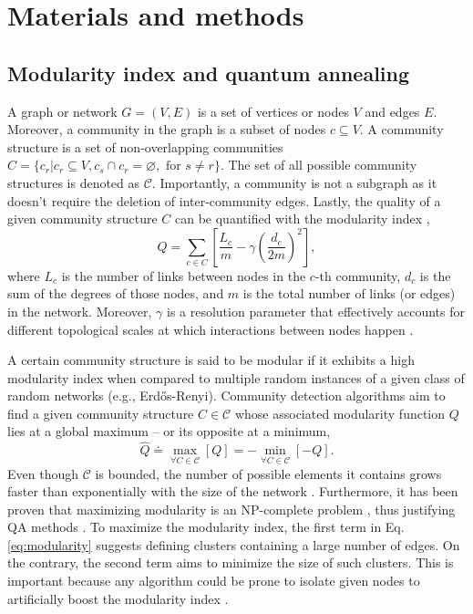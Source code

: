 \documentclass[pdflatex,sn-mathphys-num]{sn-jnl}%
\begin{document}
\section*{Materials and methods} \label{sec:methods}
\subsection*{Modularity index and quantum annealing}
A graph or network $G=(V,E)$ is a set of vertices or nodes $V$ and edges $E$. Moreover, a community in the graph is a subset of nodes $c\subseteq V$. A community structure is a set of non-overlapping communities $C=\{c_r | c_r \subseteq V, c_s \cap c_r=\varnothing, \text{ for } s \neq r \}$. The set of all possible community structures is denoted as  $\mathcal{C}$. Importantly, a community is not a subgraph as it doesn't require the deletion of inter-community edges. Lastly, the quality of a given community structure $C$ can be quantified with the modularity index \cite{Newman2004},
\begin{equation} \label{eq:modularity}
    Q = \sum_{c \in C}\left[ \frac{L_c}{m} - \gamma \left(\frac{d_c}{2m}\right)^2\right],
\end{equation} where $L_c$ is the number of links between nodes in the $c$-th community, $d_c$ is the sum of the degrees of those nodes, and $m$ is the total number of links (or edges) in the network. Moreover, $\gamma$ is a resolution parameter that effectively accounts for different topological scales \cite{Reichardt2006} at which interactions between nodes happen \cite{Delvenne2010}.

A certain community structure is said to be modular if it exhibits a high modularity index when compared to multiple random instances of a given class of random networks (e.g., Erd\H{o}s-Renyi). Community detection algorithms aim to find a given community structure $C \in \mathcal{C}$ whose associated modularity function $Q$ lies at a global maximum -- or its opposite at a minimum, 
\begin{equation}\label{eq:min_mod}
    \hat{Q} \doteq \max_{\forall C \in \mathcal{C}} \left[Q\right] = - \min_{\forall C \in \mathcal{C}} \left[-Q\right].
\end{equation}
Even though $\mathcal{C}$ is bounded, the number of possible elements it contains grows faster than exponentially with the size of the network \cite{Fortunato2007}. Furthermore, it has been proven that maximizing modularity is an NP-complete problem \cite{Brandes2008}, thus justifying QA methods \cite{Farhi2001}. To maximize the modularity index, the first term in Eq. \ref{eq:modularity} suggests defining clusters containing a large number of edges. 
On the contrary, the second term aims to minimize the size of such clusters.
This is important because any algorithm could be prone to isolate given nodes to artificially boost the modularity index \cite{Wierzbinski2023}.
\end{document}
